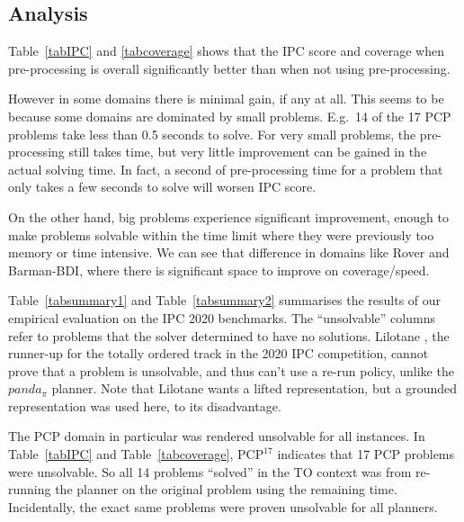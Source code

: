 \documentclass[runningheads]{llncs}
\begin{document}
 
\subsection{Analysis}

Table~\ref{tabIPC} and \ref{tabcoverage} shows that the IPC score and coverage when pre-processing is overall significantly better than when not using pre-processing. 

However in some domains there is minimal gain, if any at all. This seems to be because some domains are dominated by small problems. E.g.\ 14 of the 17 PCP problems take less than 0.5 seconds to solve. For very small problems, the pre-processing still takes time, but very little improvement can be gained in the actual solving time. In fact, a second of pre-processing time for a problem that only takes a few seconds to solve will worsen IPC score. 

On the other hand, big problems experience significant improvement, enough to make problems solvable within the time limit where they were previously too memory or time intensive. We can see that difference in domains like Rover and Barman-BDI, where there is significant space to improve on coverage/speed.
 



Table~\ref{tabsummary1} and Table~\ref{tabsummary2} summarises the results of our empirical evaluation on the IPC 2020 benchmarks. The \enquote{unsolvable} columns refer to problems that the solver determined to have no solutions. Lilotane \cite{Lilotane}, the runner-up for the totally ordered track in the 2020 IPC competition, cannot prove that a problem is unsolvable, and thus can't use a re-run policy, unlike the $panda_{\pi}$ planner.
Note that Lilotane wants a lifted representation,
but a grounded representation was used here, to its disadvantage.

The PCP domain in particular was rendered unsolvable for all instances.  In Table~\ref{tabIPC} and Table~\ref{tabcoverage}, $\text{PCP}^{17}$ indicates that 17 PCP problems were unsolvable. So all 14 problems \enquote{solved} in the TO context was from re-running the planner on the original problem using the remaining time. Incidentally, the exact same problems were proven unsolvable for all planners.
\end{document}

